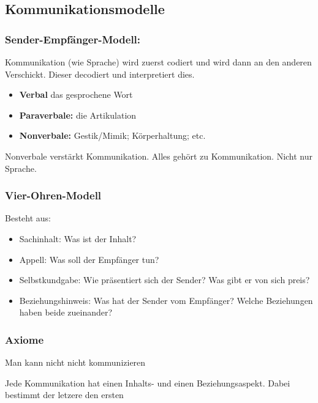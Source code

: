 
\subsection{Kommunikationsmodelle}
\label{sec:kommunikationsmodelle}

\subsubsection{Sender-Empfänger-Modell:}

Kommunikation (wie Sprache) wird zuerst codiert und wird dann an den anderen Verschickt. Dieser decodiert und interpretiert dies.


\begin{itemize}
    \item \textbf{Verbal} das gesprochene Wort
    \item \textbf{Paraverbale:} die Artikulation
    \item \textbf{Nonverbale:} Gestik/Mimik; Körperhaltung; etc.
\end{itemize}

 Nonverbale verstärkt Kommunikation. Alles gehört zu Kommunikation. Nicht nur Sprache.


\subsubsection{Vier-Ohren-Modell}


Besteht aus:
\begin{itemize}
    \item Sachinhalt: Was ist der Inhalt?
    \item Appell: Was soll der Empfänger tun?
    \item Selbstkundgabe: Wie präsentiert sich der Sender? Was gibt er von sich preis?
    \item Beziehungshinweis: Was hat der Sender vom Empfänger? Welche Beziehungen haben beide zueinander?
\end{itemize}

\subsubsection{Axiome}

 Man kann nicht nicht kommunizieren

 Jede Kommunikation hat einen Inhalts- und einen Beziehungsaspekt. Dabei bestimmt der letzere den ersten

